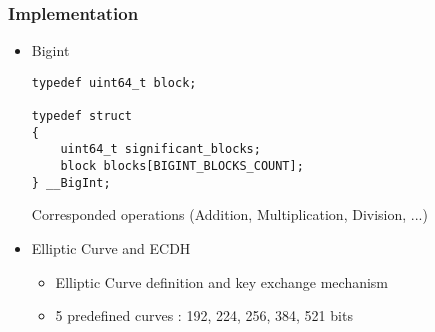 \begin{frame}[fragile]
\frametitle{Implementation}
\begin{itemize}
\setlength\itemsep{1.5em}
\item{Bigint
\begin{lstlisting}[frame=single, basicstyle=\scriptsize]
typedef uint64_t block;

typedef struct 
{
    uint64_t significant_blocks;    
    block blocks[BIGINT_BLOCKS_COUNT]; 
} __BigInt;
\end{lstlisting}
Corresponded operations (Addition, Multiplication, Division, ...)
}
\item{Elliptic Curve and ECDH
\begin{itemize}
\item{Elliptic Curve definition and key exchange mechanism}
\item{5 predefined curves : 192, 224, 256, 384, 521 bits}
\end{itemize}
}
\end{itemize}

\end{frame}